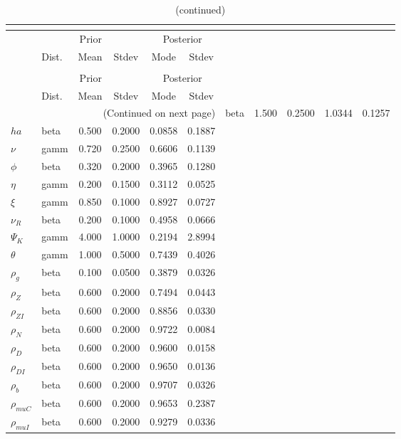  
\begin{center}
\begin{longtable}{llcccc} 
\caption{Results from posterior maximization (parameters)}\\
 \label{Table:Posterior:1}\\
\toprule 
  & \multicolumn{3}{c}{Prior}  &  \multicolumn{2}{c}{Posterior} \\
  \cmidrule(r{.75em}){2-4} \cmidrule(r{.75em}){5-6}
  & Dist. & Mean  & Stdev & Mode & Stdev \\ 
\midrule \endfirsthead 
\caption{(continued)}\\
 \bottomrule 
  & \multicolumn{3}{c}{Prior}  &  \multicolumn{2}{c}{Posterior} \\
  \cmidrule(r{.75em}){2-4} \cmidrule(r{.75em}){5-6}
  & Dist. & Mean  & Stdev & Mode & Stdev \\ 
\midrule \endhead 
\bottomrule \multicolumn{6}{r}{(Continued on next page)}\endfoot 
\bottomrule\endlastfoot 
${\sigma}$ & beta &   1.500 & 0.2500 &   1.0344 &  0.1257 \\ 
${ha}$ & beta &   0.500 & 0.2000 &   0.0858 &  0.1887 \\ 
$\nu$ & gamm &   0.720 & 0.2500 &   0.6606 &  0.1139 \\ 
${\phi}$ & beta &   0.320 & 0.2000 &   0.3965 &  0.1280 \\ 
${\eta}$ & gamm &   0.200 & 0.1500 &   0.3112 &  0.0525 \\ 
$\xi$ & gamm &   0.850 & 0.1000 &   0.8927 &  0.0727 \\ 
${\nu_R}$ & beta &   0.200 & 0.1000 &   0.4958 &  0.0666 \\ 
${\Psi_{K}}$ & gamm &   4.000 & 1.0000 &   0.2194 &  2.8994 \\ 
${\theta}$ & gamm &   1.000 & 0.5000 &   0.7439 &  0.4026 \\ 
${\rho_g}$ & beta &   0.100 & 0.0500 &   0.3879 &  0.0326 \\ 
${\rho_Z}$ & beta &   0.600 & 0.2000 &   0.7494 &  0.0443 \\ 
${\rho_{ZI}}$ & beta &   0.600 & 0.2000 &   0.8856 &  0.0330 \\ 
${\rho_N}$ & beta &   0.600 & 0.2000 &   0.9722 &  0.0084 \\ 
${\rho_D}$ & beta &   0.600 & 0.2000 &   0.9600 &  0.0158 \\ 
${\rho_{DI}}$ & beta &   0.600 & 0.2000 &   0.9650 &  0.0136 \\ 
${\rho_b}$ & beta &   0.600 & 0.2000 &   0.9707 &  0.0326 \\ 
${\rho_{muC}}$ & beta &   0.600 & 0.2000 &   0.9653 &  0.2387 \\ 
${\rho_{muI}}$ & beta &   0.600 & 0.2000 &   0.9279 &  0.0336 \\ 
\end{longtable}
 \end{center}
